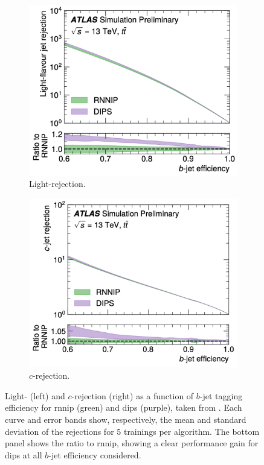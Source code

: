 \begin{figure}[h!]
  \centering
  \begin{subfigure}[b]{0.48\textwidth}
      \centering
      \includegraphics[width=\textwidth]{Images/FTAG/dipsrnnipL.png}
      \caption{Light-rejection.} 
      \label{fig:dipsrnnipPerfL}
  \end{subfigure}
  \hfill
  \begin{subfigure}[b]{0.48\textwidth}
      \centering
      \includegraphics[width=\textwidth]{Images/FTAG/dipsrnnipC.png}
      \caption{$c$-rejection.} 
      \label{fig:dipsrnnipPerfC}
  \end{subfigure}
  \caption{Light- (left) and $c$-rejection (right) as a function of $b$-jet tagging efficiency for \gls{rnnip} (green) and \gls{dips} (purple), taken from \cite{ATL-PHYS-PUB-2020-014}. Each curve and error bands show, respectively, the mean and standard deviation of the rejections for 5 trainings per algorithm. The bottom panel shows the ratio to \gls{rnnip}, showing a clear performance gain for \gls{dips} at all $b$-jet efficiency considered.}
  \label{fig:dipsrnnipPerf}
\end{figure} 

